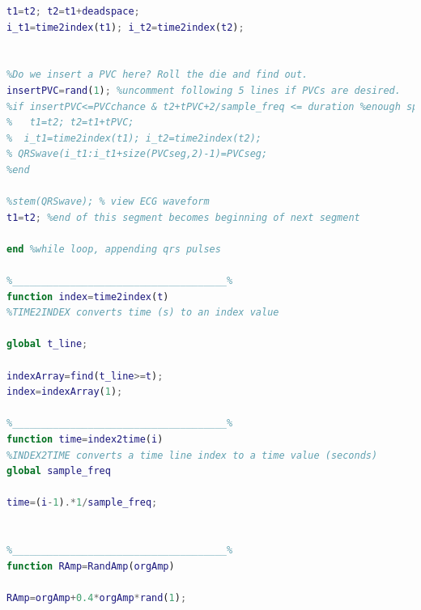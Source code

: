 \begin{lstlisting}[language=Matlab]
%Segment 6, remaining deadspace
t1=t2; t2=t1+deadspace;
i_t1=time2index(t1); i_t2=time2index(t2);


%Do we insert a PVC here? Roll the die and find out.
insertPVC=rand(1); %uncomment following 5 lines if PVCs are desired.
%if insertPVC<=PVCchance & t2+tPVC+2/sample_freq <= duration %enough space to insert PVC
%   t1=t2; t2=t1+tPVC;
%  i_t1=time2index(t1); i_t2=time2index(t2);
% QRSwave(i_t1:i_t1+size(PVCseg,2)-1)=PVCseg;
%end

%stem(QRSwave); % view ECG waveform
t1=t2; %end of this segment becomes beginning of next segment

end %while loop, appending qrs pulses

%_____________________________________%
function index=time2index(t)
%TIME2INDEX converts time (s) to an index value

global t_line;

indexArray=find(t_line>=t);
index=indexArray(1); 

%_____________________________________%
function time=index2time(i)
%INDEX2TIME converts a time line index to a time value (seconds)
global sample_freq

time=(i-1).*1/sample_freq;


%_____________________________________%
function RAmp=RandAmp(orgAmp)

RAmp=orgAmp+0.4*orgAmp*rand(1);
\end{lstlisting}
